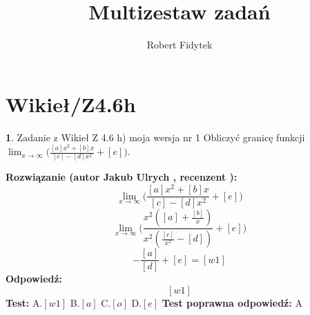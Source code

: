 \documentclass[12pt, a4paper]{article}
\title{Multizestaw zadań}
\author{Robert Fidytek}
\date{}
\theoremstyle{definition} %
\newtheorem{zad}{}
\newcommand{\kategoria}[1]{\section{#1}} %
\newcommand{\zadStart}[1]{\begin{zad}#1\newline} %
\newcommand{\zadStop}{\end{zad}}   %
\newcommand{\rozwStart}[2]{\noindent \textbf{Rozwiązanie (autor #1 , recenzent #2): }\newline} %
\newcommand{\rozwStop}{\newline}                                            %
\newcommand{\odpStart}{\noindent \textbf{Odpowiedź:}\newline}    %
\newcommand{\odpStop}{\newline}                                             %
\newcommand{\testStart}{\noindent \textbf{Test:}\newline} %
\newcommand{\testStop}{\newline} %
\newcommand{\kluczStart}{\noindent \textbf{Test poprawna odpowiedź:}\newline} %
\newcommand{\kluczStop}{\newline} %
\begin{document}
\maketitle


\kategoria{Wikieł/Z4.6h}
\zadStart{Zadanie z Wikieł Z 4.6 h) moja wersja nr 1}
Obliczyć granicę funkcji $\lim_{x \to \infty}\bigg(\frac{[a]x^{2}+[b]x}{[c]-[d]x^{2}}+[e]\bigg)$.
\zadStop
\rozwStart{Jakub Ulrych}{}
$$\lim_{x \to \infty}\bigg(\frac{[a]x^{2}+[b]x}{[c]-[d]x^{2}}+[e]\bigg)$$
$$\lim_{x \to \infty}\bigg(\frac{x^{2}([a]+\frac{[b]}{x})}{x^{2}(\frac{[c]}{x^{2}}-[d])}+[e]\bigg)$$
$$-\frac{[a]}{[d]}+[e]=[w1]$$
\rozwStop
\odpStart
$$[w1]$$
\odpStop
\testStart
A.$[w1]$
B.$[a]$
C.$[o]$
D.$[e]$
\testStop
\kluczStart
A
\kluczStop
\end{document}
